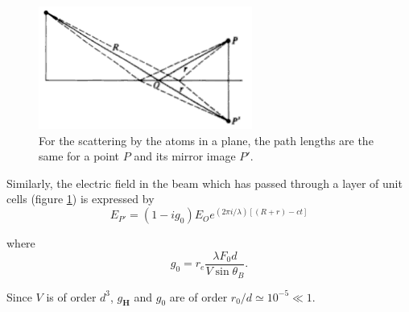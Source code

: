 \documentclass[12pt,oneside,notitlepage,abstracton,a4paper]{scrartcl}
\begin{document}
\begin{figure}[h]
\begin{center}
\includegraphics[width=7cm]{pics/picture2.png}
\vspace{-10pt}
\caption{For the scattering by the atoms in a plane, the path lengths are the same for a point $P$ and its mirror image $P'$.}
\label{pic2}
\vspace{-10pt}
\end{center}
\end{figure}


Similarly, the electric field in the beam which has passed through a layer of unit cells (figure \ref{pic2}) is expressed by
\begin{equation}\label{Et}
 E_{P'}=(1-ig_0)E_Oe^{(2\pi i /\lambda)[(R+r)-ct]}
\end{equation}

where
\begin{equation} \label{eqg0}
 g_0=r_e\frac{\lambda F_0 d}{V \sin{\theta_B}}.
\end{equation}

Since $V$ is of order $d^3$, $g_\mathbf{H}$ and $g_0$ are of order $r_0/d \simeq 10^{-5} \ll 1$.

\newpage
\end{document}
